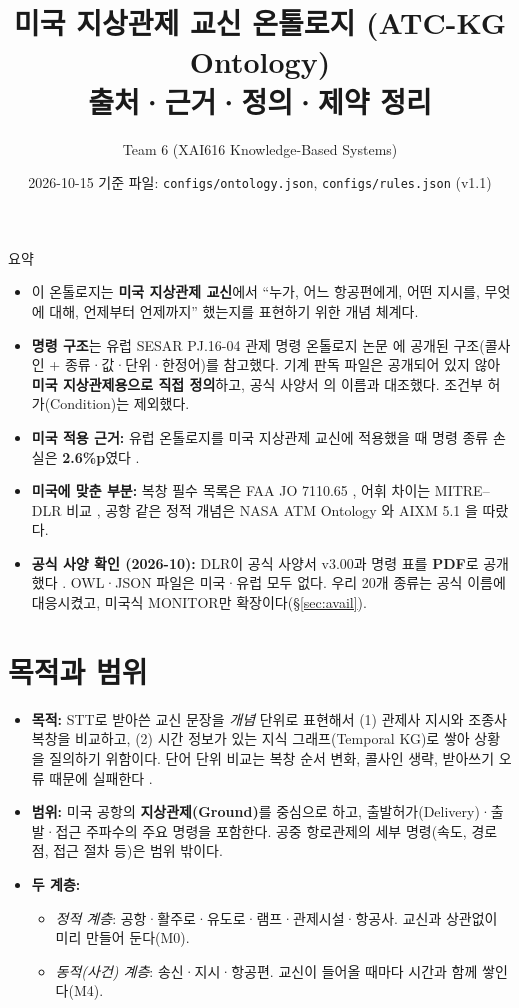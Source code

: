 \documentclass[10pt,a4paper]{article}
\title{\textbf{미국 지상관제 교신 온톨로지 (ATC-KG Ontology)}\\[3pt]\large 출처·근거·정의·제약 정리}
\author{Team 6 \quad (XAI616 Knowledge-Based Systems)}
\date{2026-10-15 \quad 기준 파일: \texttt{configs/ontology.json}, \texttt{configs/rules.json} (v1.1)}
\begin{document}
\sloppy
\maketitle

\begin{note}{요약}
\begin{itemize}[leftmargin=12pt]
\item 이 온톨로지는 \textbf{미국 지상관제 교신}에서 ``누가, 어느 항공편에게, 어떤 지시를, 무엇에 대해, 언제부터 언제까지'' 했는지를 표현하기 위한 개념 체계다.
\item \textbf{명령 구조}는 유럽 SESAR PJ.16-04 관제 명령 온톨로지 논문 \cite{helmke2018}에 공개된 구조(콜사인 + 종류·값·단위·한정어)를 참고했다. 기계 판독 파일은 공개되어 있지 않아 \textbf{미국 지상관제용으로 직접 정의}하고, 공식 사양서 \cite{dlr2025}의 이름과 대조했다. 조건부 허가(Condition)는 제외했다.
\item \textbf{미국 적용 근거:} 유럽 온톨로지를 미국 지상관제 교신에 적용했을 때 명령 종류 손실은 \textbf{2.6\%p}였다 \cite{helmke2025loss}.
\item \textbf{미국에 맞춘 부분:} 복창 필수 목록은 FAA JO 7110.65 \cite{faa7110}, 어휘 차이는 MITRE--DLR 비교 \cite{chen2023}, 공항 같은 정적 개념은 NASA ATM Ontology \cite{keller2017}와 AIXM 5.1 \cite{aixm}을 따랐다.
\item \textbf{공식 사양 확인 (2026-10):} DLR이 공식 사양서 v3.00과 명령 표를 \textbf{PDF}로 공개했다 \cite{dlr2025}. OWL·JSON 파일은 미국·유럽 모두 없다. 우리 20개 종류는 공식 이름에 대응시켰고, 미국식 MONITOR만 확장이다(\S\ref{sec:avail}).
\end{itemize}
\end{note}

\tableofcontents

\section{목적과 범위}
\begin{itemize}
\item \textbf{목적:} STT로 받아쓴 교신 문장을 \emph{개념} 단위로 표현해서 (1) 관제사 지시와 조종사 복창을 비교하고, (2) 시간 정보가 있는 지식 그래프(Temporal KG)로 쌓아 상황을 질의하기 위함이다. 단어 단위 비교는 복창 순서 변화, 콜사인 생략, 받아쓰기 오류 때문에 실패한다 \cite{helmke2021}.
\item \textbf{범위:} 미국 공항의 \textbf{지상관제(Ground)}를 중심으로 하고, 출발허가(Delivery)·출발·접근 주파수의 주요 명령을 포함한다. 공중 항로관제의 세부 명령(속도, 경로점, 접근 절차 등)은 범위 밖이다.
\item \textbf{두 계층:}
  \begin{itemize}
  \item \emph{정적 계층}: 공항·활주로·유도로·램프·관제시설·항공사. 교신과 상관없이 미리 만들어 둔다(M0).
  \item \emph{동적(사건) 계층}: 송신·지시·항공편. 교신이 들어올 때마다 시간과 함께 쌓인다(M4).
  \end{itemize}
\end{itemize}
\end{document}
